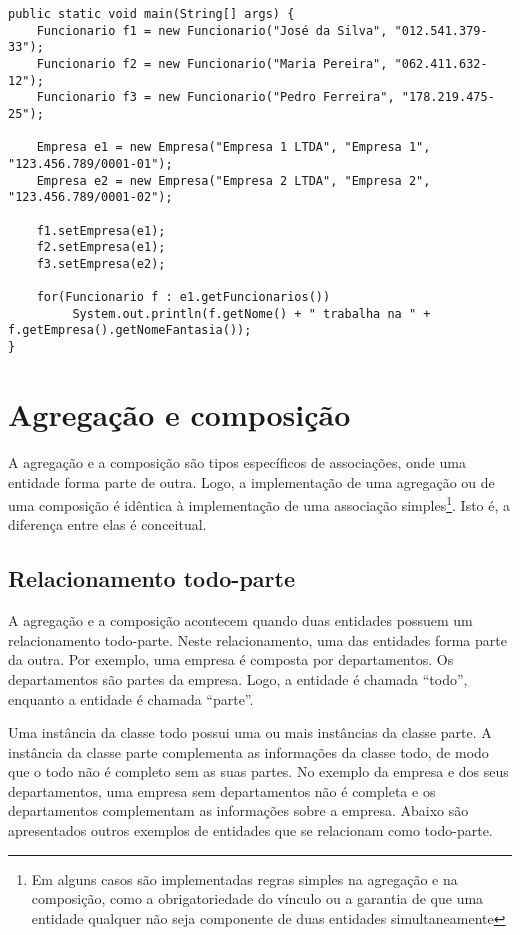 \begin{verbatim}
public static void main(String[] args) {
	Funcionario f1 = new Funcionario("José da Silva", "012.541.379-33");
	Funcionario f2 = new Funcionario("Maria Pereira", "062.411.632-12");
	Funcionario f3 = new Funcionario("Pedro Ferreira", "178.219.475-25");

	Empresa e1 = new Empresa("Empresa 1 LTDA", "Empresa 1", "123.456.789/0001-01");
	Empresa e2 = new Empresa("Empresa 2 LTDA", "Empresa 2", "123.456.789/0001-02");

	f1.setEmpresa(e1);
	f2.setEmpresa(e1);
	f3.setEmpresa(e2);

	for(Funcionario f : e1.getFuncionarios())
		 System.out.println(f.getNome() + " trabalha na " + f.getEmpresa().getNomeFantasia());
}
\end{verbatim}


\section{Agregação e composição}

A agregação e a composição são tipos específicos de associações, onde uma entidade forma parte de outra. Logo, a implementação de uma agregação ou de uma composição é idêntica à implementação de uma associação simples\footnote{Em alguns casos são implementadas regras simples na agregação e na composição, como a obrigatoriedade do vínculo ou a garantia de que uma entidade qualquer não seja componente de duas entidades simultaneamente}. Isto é, a diferença entre elas é conceitual.

\subsection{Relacionamento todo-parte}

A agregação e a composição acontecem quando duas entidades possuem um relacionamento todo-parte. Neste relacionamento, uma das entidades forma parte da outra. Por exemplo, uma empresa é composta por departamentos. Os departamentos são partes da empresa. Logo, a entidade  é chamada ``todo'', enquanto a entidade  é chamada ``parte''.

Uma instância da classe todo possui uma ou mais instâncias da classe parte. A instância da classe parte complementa as informações da classe todo, de modo que o todo não é completo sem as suas partes. No exemplo da empresa e dos seus departamentos, uma empresa sem departamentos não é completa e os departamentos complementam as informações sobre a empresa. Abaixo são apresentados outros exemplos de entidades que se relacionam como todo-parte.

